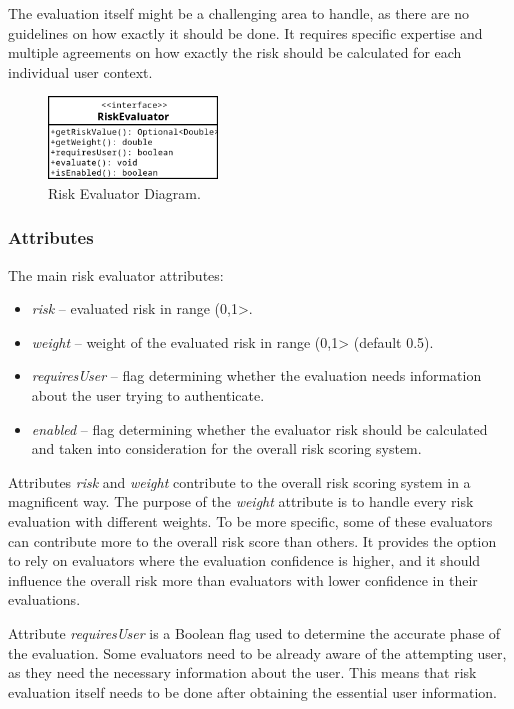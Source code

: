 The evaluation itself might be a challenging area to handle, as there are no guidelines on how exactly it should be done.
It requires specific expertise and multiple agreements on how exactly the risk should be calculated for each individual user context.

\begin{figure}[htbp]
  \centering
  \includegraphics[width=0.4\textwidth]{img/sections/5-design/riskEvaluator.png}
  \caption{Risk Evaluator Diagram.}
  \label{fig:design-user-evaluator-diagram}
\end{figure}

\subsubsection{Attributes}
The main risk evaluator attributes:

\begin{itemize}
    \item \textit{risk} -- evaluated risk in range (0,1>.
    \item \textit{weight} -- weight of the evaluated risk in range (0,1> (default 0.5).
    \item \textit{requiresUser} -- flag determining whether the evaluation needs information about the user trying to authenticate. 
    \item \textit{enabled} -- flag determining whether the evaluator risk should be calculated and taken into consideration for the overall risk scoring system. 
\end{itemize}

Attributes \textit{risk} and \textit{weight} contribute to the overall risk scoring system in a magnificent way.
The purpose of the \textit{weight} attribute is to handle every risk evaluation with different weights.
To be more specific, some of these evaluators can contribute more to the overall risk score than others.
It provides the option to rely on evaluators where the evaluation confidence is higher, and it should influence the overall risk more than evaluators with lower confidence in their evaluations.

Attribute \textit{requiresUser} is a Boolean flag used to determine the accurate phase of the evaluation.
Some evaluators need to be already aware of the attempting user, as they need the necessary information about the user.
This means that risk evaluation itself needs to be done after obtaining the essential user information.


